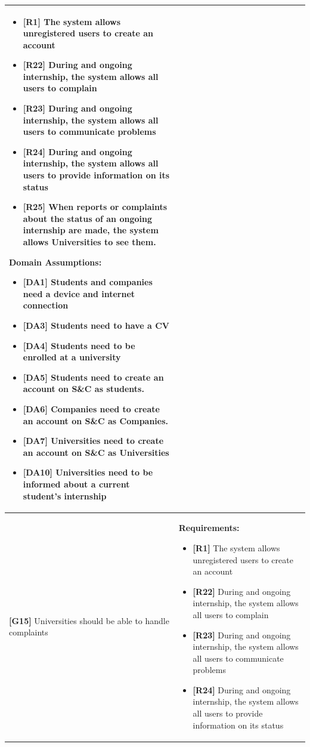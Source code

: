 \begin{longtable}{|p{}|p{}|}
\begin{itemize}
    \item \textbf{[R1]} The system allows unregistered users to create an account
    \item \textbf{[R22]} During and ongoing internship, the system allows all users to complain
    \item \textbf{[R23]} During and ongoing internship, the system allows all users to communicate problems
    \item \textbf{[R24]} During and ongoing internship, the system allows all users to provide information on its status
    \item \textbf{[R25]} When reports or complaints about the status of an ongoing internship are made, the system allows Universities to see them.
\end{itemize}
\textbf{Domain Assumptions:}
\begin{itemize}
    \item \textbf{[DA1]} Students and companies need a device and internet connection
     \item \textbf{[DA3]} Students need to have a CV
     \item \textbf{[DA4]} Students need to be enrolled at a university
    \item \textbf{[DA5]} Students need to create an account on S\&C as students.
    \item \textbf{[DA6]} Companies need to create an account on S\&C as Companies.
    \item \textbf{[DA7]} Universities need to create an account on S\&C as Universities
    \item \textbf{[DA10]} Universities need to be informed about a current student’s internship
\end{itemize} \\
\hline
\textbf{[G15]} Universities should be able to handle complaints
& 
\textbf{Requirements:}
\begin{itemize}
    \item \textbf{[R1]} The system allows unregistered users to create an account
    \item \textbf{[R22]} During and ongoing internship, the system allows all users to complain
    \item \textbf{[R23]} During and ongoing internship, the system allows all users to communicate problems
    \item \textbf{[R24]} During and ongoing internship, the system allows all users to provide information on its status

\end{itemize}
\end{longtable}
